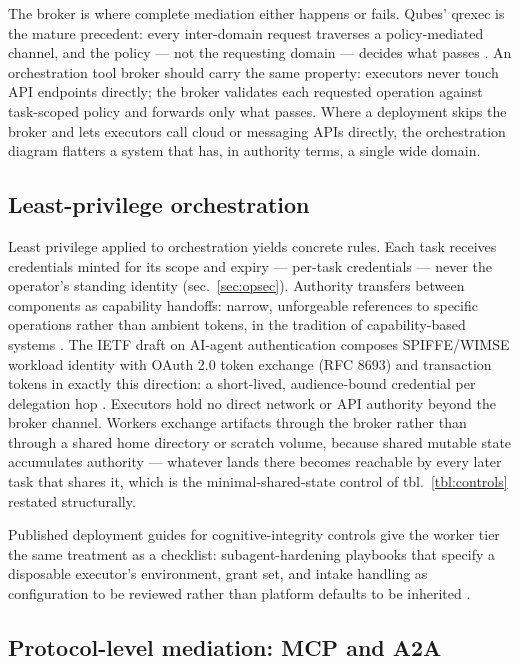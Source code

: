 \documentclass[
  english,
  9pt,
]{extarticle}
\begin{document}
The broker is where complete mediation \citep{saltzer1975} either
happens or fails. Qubes' qrexec is the mature precedent: every
inter-domain request traverses a policy-mediated channel, and the policy
--- not the requesting domain --- decides what passes
\citep{qubes_qrexec}. An orchestration tool broker should carry the same
property: executors never touch API endpoints directly; the broker
validates each requested operation against task-scoped policy and
forwards only what passes. Where a deployment skips the broker and lets
executors call cloud or messaging APIs directly, the orchestration
diagram flatters a system that has, in authority terms, a single wide
domain.

\subsection{Least-privilege
orchestration}\label{least-privilege-orchestration}

Least privilege \citep{saltzer1975} applied to orchestration yields
concrete rules. Each task receives credentials minted for its scope and
expiry --- per-task credentials --- never the operator's standing
identity (sec.~\ref{sec:opsec}). Authority transfers between components
as capability handoffs: narrow, unforgeable references to specific
operations rather than ambient tokens, in the tradition of
capability-based systems \citep{levy1984}. The IETF draft on AI-agent
authentication composes SPIFFE/WIMSE workload identity with OAuth 2.0
token exchange (RFC 8693) and transaction tokens in exactly this
direction: a short-lived, audience-bound credential per delegation hop
\citep{ietf_agent_identity}. Executors hold no direct network or API
authority beyond the broker channel. Workers exchange artifacts through
the broker rather than through a shared home directory or scratch
volume, because shared mutable state accumulates authority --- whatever
lands there becomes reachable by every later task that shares it, which
is the minimal-shared-state control of tbl.~\ref{tbl:controls} restated
structurally.

Published deployment guides for cognitive-integrity controls give the
worker tier the same treatment as a checklist: subagent-hardening
playbooks that specify a disposable executor's environment, grant set,
and intake handling as configuration to be reviewed rather than platform
defaults to be inherited \citep{cif_practitioner_2026}.

\subsection{Protocol-level mediation: MCP and
A2A}\label{protocol-level-mediation-mcp-and-a2a}
\end{document}

